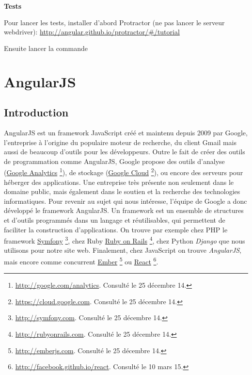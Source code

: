 \documentclass[a4paper,10pt,twoside]{sphinxmanual}
\begin{document}
\textbf{Tests}

Pour lancer les tests, installer d'abord Protractor (ne pas lancer le serveur webdriver): \href{http://angular.github.io/protractor/\#/tutorial}{http://angular.github.io/protractor/\#/tutorial}

Ensuite lancer la commande 


\chapter{AngularJS}
\label{angularjs:angularjs}\label{angularjs::doc}

\section{Introduction}
\label{angularjs:introduction}
AngularJS est un framework JavaScript créé et maintenu depuis 2009 par Google, l'entreprise à l'origine du populaire moteur de recherche, du client Gmail mais aussi de beaucoup d'outils pour les développeurs. Outre le fait de créer des outils de programmation comme AngularJS, Google propose des outils d'analyse (\href{http://google.com/analytics}{Google Analytics} \footnote{
\href{http://google.com/analytics}{http://google.com/analytics}. Consulté le 25 décembre 14.
}), de stockage (\href{https://cloud.google.com}{Google Cloud} \footnote{
\href{https://cloud.google.com}{https://cloud.google.com}. Consulté le 25 décembre 14.
}), ou encore des serveurs pour héberger des applications. Une entreprise très présente non seulement dans le domaine public, mais également dans le soutien et la recherche des technologies informatiques. Pour revenir au sujet qui nous intéresse, l'équipe de Google a donc développé le framework AngularJS. Un framework est un ensemble de structures et d'outils programmés dans un langage et réutilisables, qui permettent de faciliter la construction d'applications. On trouve par exemple chez PHP le framework \href{http://symfony.com}{Symfony} \footnote{
\href{http://symfony.com}{http://symfony.com}. Consulté le 25 décembre 14.
}, chez Ruby \href{http://rubyonrails.com}{Ruby on Rails} \footnote{
\href{http://rubyonrails.com}{http://rubyonrails.com}. Consulté le 25 décembre 14.
}, chez Python \emph{Django} que nous utilisons pour notre site web. Finalement, chez JavaScript on trouve \emph{AngularJS}, mais encore comme concurrent \href{http://emberjs.com}{Ember} \footnote{
\href{http://emberjs.com}{http://emberjs.com}. Consulté le 25 décembre 14.
} ou \href{http://facebook.github.io/react/}{React} \footnote{
\href{http://facebook.github.io/react}{http://facebook.github.io/react}. Consulté le 10 mars 15.
}.
\end{document}
